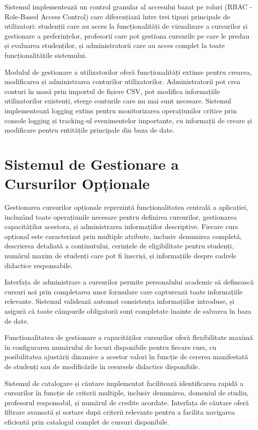 \documentclass[12pt,a4paper]{report}
\begin{document}
Sistemul implementează un control granular al accesului bazat pe roluri (RBAC - Role-Based Access Control) care diferențiază între trei tipuri principale de utilizatori: studenții care au acces la funcționalități de vizualizare a cursurilor și gestionare a preferințelor, profesorii care pot gestiona cursurile pe care le predau și evaluarea studenților, și administratorii care au acces complet la toate funcționalitățile sistemului.

Modulul de gestionare a utilizatorilor oferă funcționalități extinse pentru crearea, modificarea și administrarea conturilor utilizatorilor. Administratorii pot crea conturi în masă prin importul de fișiere CSV, pot modifica informațiile utilizatorilor existenți, sterge conturile care nu mai sunt necesare. Sistemul implementează logging extins pentru monitorizarea operațiunilor critice prin console logging și tracking-ul evenimentelor importante, cu informații de creare și modificare pentru entitățile principale din baza de date.

\section{Sistemul de Gestionare a Cursurilor Opționale}

Gestionarea cursurilor opționale reprezintă funcționalitatea centrală a aplicației, incluzând toate operațiunile necesare pentru definirea cursurilor, gestionarea capacităților acestora, și administrarea informațiilor descriptive. Fiecare curs opțional este caracterizat prin multiple atribute, inclusiv denumirea completă, descrierea detaliată a conținutului, cerințele de eligibilitate pentru studenți, numărul maxim de studenți care pot fi înscriși, și informațiile despre cadrele didactice responsabile.

Interfața de administrare a cursurilor permite personalului academic să definească cursuri noi prin completarea unor formulare care capturează toate informațiile relevante. Sistemul validează automat consistența informațiilor introduse, și asigură că toate câmpurile obligatorii sunt completate înainte de salvarea în baza de date.

Funcționalitatea de gestionare a capacităților cursurilor oferă flexibilitate maximă în configurarea numărului de locuri disponibile pentru fiecare curs, cu posibilitatea ajustării dinamice a acestor valori în funcție de cererea manifestată de studenți sau de modificările în resursele didactice disponibile.

Sistemul de catalogare și căutare implementat facilitează identificarea rapidă a cursurilor în funcție de criterii multiple, inclusiv denumirea, domeniul de studiu, profesorul responsabil, și numărul de credite acordate. Interfața de căutare oferă filtrare avansată și sortare după criterii relevante pentru a facilita navigarea eficientă prin catalogul complet de cursuri disponibile.
\end{document}
